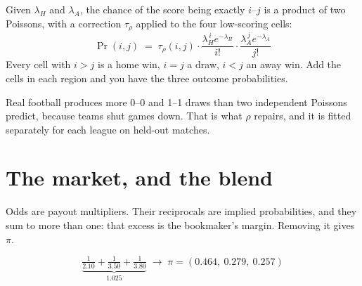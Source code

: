 \documentclass[11pt,a4paper]{article}
\begin{document}
Given $\lambda_H$ and $\lambda_A$, the chance of the score being exactly $i$--$j$
is a product of two Poissons, with a correction $\tau_\rho$ applied to the four
low-scoring cells:
\[
\Pr(i,j) \;=\; \tau_\rho(i,j)\cdot
\frac{\lambda_H^{\,i}e^{-\lambda_H}}{i!}\cdot
\frac{\lambda_A^{\,j}e^{-\lambda_A}}{j!}
\]
Every cell with $i>j$ is a home win, $i=j$ a draw, $i<j$ an away win. Add the
cells in each region and you have the three outcome probabilities.

\begin{center}
\end{center}

Real football produces more 0--0 and 1--1 draws than two independent Poissons
predict, because teams shut games down. That is what $\rho$ repairs, and it is
fitted separately for each league on held-out matches.

\section*{The market, and the blend}

Odds are payout multipliers. Their reciprocals are implied probabilities, and
they sum to more than one: that excess is the bookmaker's margin. Removing it
gives $\pi$.

\[
\underbrace{\tfrac{1}{2.10}+\tfrac{1}{3.50}+\tfrac{1}{3.80}}_{\textstyle 1.025}
\;\longrightarrow\;
\pi=(0.464,\ 0.279,\ 0.257)
\]
\end{document}
